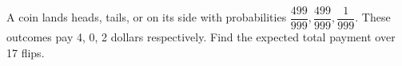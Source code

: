A coin lands heads, tails, or on its side with probabilities $\dfrac{499}{999},\dfrac{499}{999},\dfrac{1}{999}$. These outcomes pay 4, 0, 2 dollars respectively. Find the expected total payment over 17 flips.
